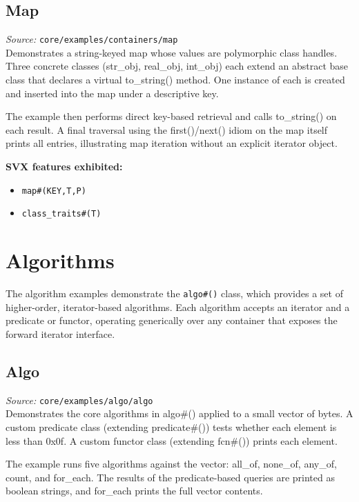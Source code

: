 \documentclass[11pt,letterpaper]{report}
\begin{document}
\section{Map}

\textit{Source:} \texttt{core/examples/containers/map}\\

Demonstrates a string-keyed map whose values are polymorphic class handles. Three concrete classes (str\_obj, real\_obj, int\_obj) each extend an abstract base class that declares a virtual to\_string() method. One instance of each is created and inserted into the map under a descriptive key.

The example then performs direct key-based retrieval and calls to\_string() on each result. A final traversal using the first()/next() idiom on the map itself prints all entries, illustrating map iteration without an explicit iterator object.

\textbf{SVX features exhibited:}

\begin{itemize}
  \item \texttt{map\#(KEY,T,P)}
  \item \texttt{class\_traits\#(T)}
\end{itemize}
\chapter{Algorithms}

The algorithm examples demonstrate the \texttt{algo\#()} class, which provides a set of higher-order, iterator-based algorithms. Each algorithm accepts an iterator and a predicate or functor, operating generically over any container that exposes the forward iterator interface.

\section{Algo}

\textit{Source:} \texttt{core/examples/algo/algo}\\

Demonstrates the core algorithms in algo\#() applied to a small vector of bytes. A custom predicate class (extending predicate\#()) tests whether each element is less than 0x0f. A custom functor class (extending fcn\#()) prints each element.

The example runs five algorithms against the vector: all\_of, none\_of, any\_of, count, and for\_each. The results of the predicate-based queries are printed as boolean strings, and for\_each prints the full vector contents.
\end{document}
